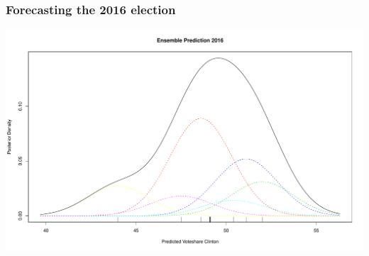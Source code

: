 \documentclass[xcolor=dvipsnames]{beamer}
\begin{document}
\begin{frame}
\frametitle{Forecasting the 2016 election}

\begin{center}
\includegraphics[scale=.38]{2016Forecast}
\end{center}

\end{frame}
\end{document}
